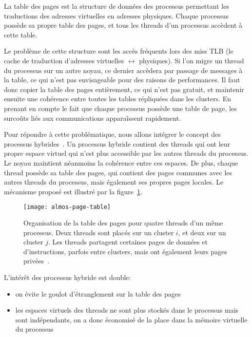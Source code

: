       La table des pages est la structure de données des processus permettant
      les traductions des adresses virtuelles en adresses physiques. Chaque
      processus possède sa propre table des pages, et tous les threads d'un
      processus accèdent à cette table.

      Le problème de cette structure sont les accès fréquents lors des miss TLB
      (le cache de traduction d'adresses virtuelles $\leftrightarrow$
      physiques). Si l'on migre un thread du processus sur un autre noyau, ce
      dernier accèdera par passage de messages à la table, ce qui n'est pas
      envisageable pour des raisons de performances. Il faut donc copier la
      table des pages entièrement, ce qui n'est pas gratuit, et maintenir
      ensuite une cohérence entre toutes les tables répliquées dans les
      clusters. En prenant en compte le fait que chaque processus possède une
      table de page, les surcoûts liés aux communications apparaîssent
      rapidement.

      Pour répondre à cette problématique, nous allons intégrer le concept des
      processus hybrides~\citep{almaless2014universite}. Un processus hybride
      contient des threads qui ont leur propre espace virtuel qui n'est plus
      accessible par les autres threads du processus. Le noyau maintient
      néanmoins la cohérence entre ces espaces. De plus, chaque thread possède
      sa table des pages, qui contient des pages communes avec les autres
      threads du processus, mais également ses propres pages locales. Le
      mécanisme proposé est illustré par la figure~\ref{fig:almos-page-table}.

      \begin{figure}[ht]
        \centering
        \texttt{[image: almos-page-table]}
        \caption{Organisation de la table des pages pour quatre threads d'un
          même processus. Deux threads sont placés sur un cluster $i$, et deux
          sur un cluster $j$. Les threads partagent certaines pages de données
          et d'instructions, parfois entre clusters, mais ont également leurs
          pages privées~\citep{almaless2014universite}.}
        \label{fig:almos-page-table}
      \end{figure}

      L'intérêt des processus hybride est double:

      \begin{itemize}
        \item on évite le goulot d'étranglement sur la table des pages
        \item les espaces virtuels des threads ne sont plus stockés dans le
          processus mais sont indépendants, on a donc économisé de la place dans
          la mémoire virtuelle du processus
      \end{itemize}

